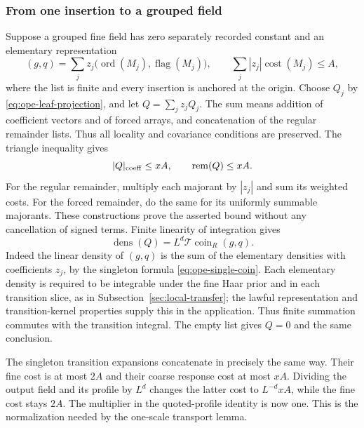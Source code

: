 \subsubsection{From one insertion to a grouped field}
Suppose a grouped fine field has zero separately recorded constant
and an elementary representation
\[
        (g,q)=\sum_j z_j\bigl(\operatorname{ord}(M_j),
                              \operatorname{flag}(M_j)\bigr),
       \qquad \sum_j|z_j|\operatorname{cost}(M_j)\le A,
\]
where the list is finite and every insertion is anchored at the
origin. Choose $Q_j$ by \eqref{eq:ope-leaf-projection}, and let
$Q=\sum_jz_jQ_j$. The sum means addition of coefficient vectors
and of forced arrays, and concatenation of the regular remainder
lists. Thus all locality and covariance conditions are preserved.
The triangle inequality gives
\begin{equation}\label{eq:ope-group-projection}
       |Q|_{\rm coeff}\le xA,\qquad
       \operatorname{rem}(Q)\le xA.
\end{equation}
For the regular remainder, multiply each majorant by $|z_j|$
and sum its weighted costs. For the forced remainder, do the
same for its uniformly summable majorants. These constructions
prove the asserted bound without any cancellation of signed
terms. Finite linearity of integration gives
\[
          \operatorname{dens}(Q)
             =L^d\mathcal T\operatorname{coin}_R(g,q).
\]
Indeed the linear density of $(g,q)$ is the sum of the elementary
densities with coefficients $z_j$, by the singleton formula
\eqref{eq:ope-single-coin}. Each elementary density is required to be integrable under the
fine Haar prior and in each transition slice, as in
Subsection~\ref{sec:local-transfer}; the lawful representation and
transition-kernel properties supply this in the application. Thus
finite summation commutes with the transition integral. The empty list gives $Q=0$ and the same
conclusion.

The singleton transition expansions concatenate in precisely
the same way. Their fine cost is at most $2A$ and their coarse
response cost at most $xA$. Dividing the output field and its
profile by $L^d$ changes the latter cost to $L^{-d}xA$, while
the fine cost stays $2A$. The multiplier in the quoted-profile
identity is now one. This is the normalization needed by the
one-scale transport lemma.

